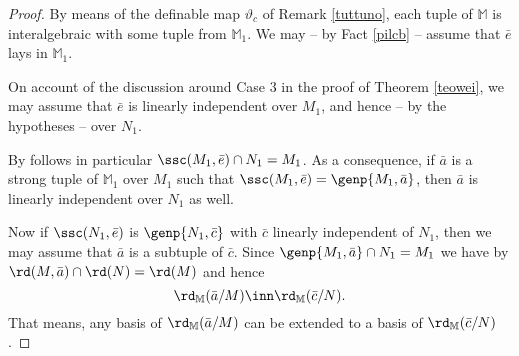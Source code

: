 \begin{proof}
By means of the definable map $\vartheta_{c}$ of Remark \ref{tuttuno}, each tuple of $\mathbb{M}$ is interalgebraic
with some tuple from $\mathbb{M}_{1}$. We may -- by Fact \ref{pilcb} -- assume that $\bar e$ lays in $\mathbb{M}_{1}$.
%
% 
%
 
On account of the discussion around Case 3 in the proof of Theorem \ref{teowei}, we may assume that
$\bar e$ is linearly independent over $M_{1}$, and hence -- by the hypotheses -- over $N_{1}$.

\smallskip
By  follows in particular $\ssc(M_{1},\bar e)\cap N_{1}=M_{1}$.
As a consequence, if $\bar a$ is
a strong tuple of $\mathbb{M}_{1}$ over $M_{1}$ such that $\ssc(M_{1},\bar e)=\genp{M_{1},\bar a}$,
then $\bar a$ is linearly independent over $N_{1}$ as well.

Now if $\ssc(N_{1},\bar e)$ is $\genp{N_{1},\bar c}$ with $\bar c$ linearly independent of $N_{1}$,
then we may assume that $\bar a$ is a subtuple of $\bar c$. Since $\genp{M_{1},\bar a}\cap N_{1}=M_{1}$ we have
by  $\rd(M,\bar a)\cap\rd(N)=\rd(M)$ and hence
$$\rd_{\mathbb{M}}(\bar a/M)\inn\rd_{\mathbb{M}}(\bar c/N).$$
That means, any basis of $\rd_{\mathbb{M}}(\bar a/M)$ can be extended to a basis of $\rd_{\mathbb{M}}(\bar c/N)$.


\end{proof}
